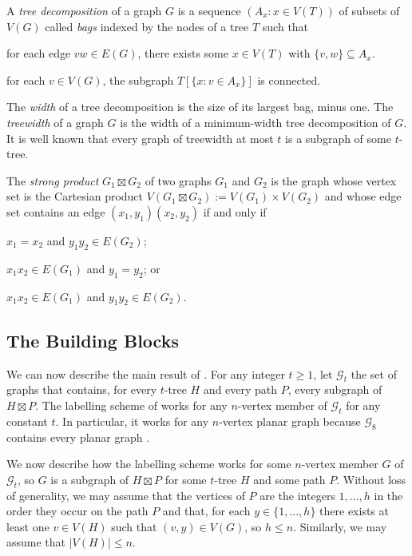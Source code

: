 \documentclass{patmorin}
\begin{document}
A \emph{tree decomposition} of a graph $G$ is a sequence $(A_x:x\in V(T))$ of subsets of $V(G)$ called \emph{bags} indexed by the nodes of a tree $T$ such that
\begin{inparaenum}[(i)]
    \item for each edge $vw\in E(G)$, there exists some $x\in V(T)$ with $\{v,w\}\subseteq A_x$.
    \item for each $v\in V(G)$, the subgraph $T[\{x:v\in A_x\}]$ is connected.
\end{inparaenum}
The \emph{width} of a tree decomposition is the size of its largest bag, minus one. The \emph{treewidth} of a graph $G$ is the width of a minimum-width tree decomposition of $G$.  It is well known that every graph of treewidth at most $t$ is a subgraph of some $t$-tree.

The \emph{strong product} $G_1\boxtimes G_2$ of two graphs $G_1$ and $G_2$ is the graph whose vertex set is the Cartesian product $V(G_1\boxtimes G_2):=V(G_1)\times V(G_2)$ and whose edge set contains an edge $(x_1,y_1)(x_2,y_2)$ if and only if
\begin{inparaenum}[(i)]
    \item $x_1=x_2$ and $y_1y_2\in E(G_2)$;
    \item $x_1x_2\in E(G_1)$ and $y_1=y_2$; or
    \item $x_1x_2\in E(G_1)$ and $y_1y_2\in E(G_2)$.
\end{inparaenum}


\subsection{The Building Blocks}

We can now describe the main result of \citet{dujmovic.esperet.ea:adjacency}.
For any integer $t\ge 1$, let $\mathcal{G}_t$ the set of graphs that contains, for every $t$-tree $H$ and every path $P$, every subgraph of $H\boxtimes P$.  The labelling scheme of \citet{dujmovic.esperet.ea:adjacency} works for any $n$-vertex member of $\mathcal{G}_t$ for any constant $t$.  In particular, it works for any $n$-vertex planar graph because $\mathcal{G}_8$ contains every planar graph \cite[Theorem~36]{dujmovic.joret.ea:planar}.

We now describe how the labelling scheme works for some $n$-vertex member $G$ of $\mathcal{G}_t$, so $G$ is a subgraph of $H\boxtimes P$ for some $t$-tree $H$ and some path $P$.  Without loss of generality, we may assume that the vertices of $P$ are the integers $1,\ldots,h$ in the order they occur on the path $P$ and that, for each $y\in\{1,\ldots,h\}$ there exists at least one $v\in V(H)$ such that $(v,y)\in V(G)$, so $h\le n$.  Similarly, we may assume that $|V(H)|\le n$.
\end{document}
